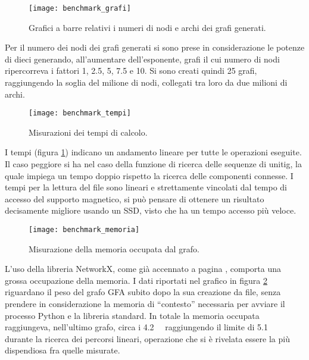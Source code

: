 \captionsetup{justification=centering, singlelinecheck=false}
\begin{figure}[h]
\centering
\texttt{[image: benchmark\_grafi]}
\caption[Grafico a barre dei grafi generati]{Grafici a barre relativi i numeri di nodi e archi dei grafi generati.}
\end{figure}
\captionsetup{justification=justified, singlelinecheck=false}
Per il numero dei nodi dei grafi generati si sono prese in considerazione
le potenze di dieci generando, all'aumentare dell'esponente, grafi il cui
numero di nodi ripercorreva i fattori 1, 2.5, 5, 7.5 e 10.
Si sono creati quindi 25 grafi, raggiungendo la soglia
del milione di nodi, collegati tra loro da due milioni di archi.


\captionsetup{justification=centering, singlelinecheck=false}
\begin{figure}
\centering
\texttt{[image: benchmark\_tempi]}
\caption[Grafici dei tempi di calcolo delle operazioni su grafo]{Misurazioni dei tempi di calcolo.}
\label{fig:bench-timings}
\end{figure}
\captionsetup{justification=justified, singlelinecheck=false}
I tempi (figura \ref{fig:bench-timings}) indicano un andamento lineare
per tutte le operazioni eseguite. Il caso peggiore si ha nel caso
della funzione di ricerca delle sequenze di unitig, la quale
impiega un tempo doppio rispetto la ricerca delle componenti connesse.
I tempi per la lettura del file sono lineari e strettamente vincolati
dal tempo di accesso del supporto magnetico, si può pensare di ottenere
un risultato decisamente migliore usando un SSD, visto che
ha un tempo accesso più veloce.

\clearpage
\captionsetup{justification=centering, singlelinecheck=false}
\begin{figure}[h]
\centering
\texttt{[image: benchmark\_memoria]}
\caption[Grafici della memoria occupata dal grafo]{Misurazione della memoria occupata dal grafo.}
\label{fig:graph-memory}
\end{figure}
\captionsetup{justification=justified, singlelinecheck=false}
L'uso della libreria NetworkX, come già accennato a pagina \pageref{sec:nx-why-limits},
comporta una grossa occupazione della memoria. I dati riportati nel grafico
in figura \ref{fig:graph-memory}
riguardano il peso del grafo GFA subito dopo la sua creazione da file, senza
prendere in considerazione la memoria di ``contesto'' necessaria per avviare
il processo Python e la libreria standard. In totale la memoria occupata
raggiungeva, nell'ultimo grafo, circa i \SI{4.2}{\giga\byte} raggiungendo
il limite di \SI{5.1}{\giga\byte} durante la ricerca dei percorsi lineari, operazione
che si è rivelata essere la più dispendiosa fra quelle misurate.

